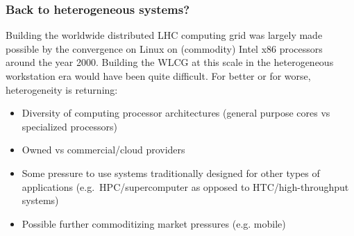 \begin{frame}
\frametitle{Back to heterogeneous systems?}

Building the worldwide distributed LHC computing grid was largely made possible by the convergence on Linux on (commodity) Intel x86 processors around the year 2000. Building the WLCG at this scale in the heterogeneous workstation era would have been quite difficult. For better or for worse, heterogeneity is returning:

\begin{itemize}
\item Diversity of computing processor architectures (general purpose cores vs specialized processors)
\item Owned vs commercial/cloud providers
\item Some pressure to use systems traditionally designed for other types of applications (e.g.\ HPC/supercomputer as opposed to HTC/high-throughput systems)
\item Possible further commoditizing market pressures (e.g. mobile)
\end{itemize}

\end{frame}


